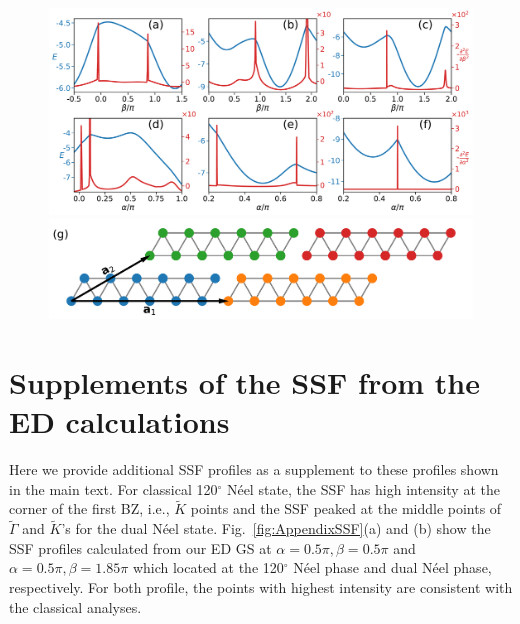\documentclass[aps,prb,reprint,amsfonts,amsmath,amssymb,showpacs,groupedaddress,superscriptaddress]{revtex4-1}
\begin{document}
{\begin{figure}
  \centering
  \includegraphics[width=\columnwidth]{fig/SecondDerivatives26.pdf}
  \includegraphics[width=\columnwidth]{fig/Cluster26.pdf}
\end{figure}
}

\section{\label{apx:SSF}Supplements of the SSF from the ED calculations}

Here we provide additional SSF profiles as a supplement to these profiles shown in the main text. For classical 120$^\circ$ N\'{e}el state, the SSF has high intensity at the corner of the first BZ, i.e., $\tilde{K}$ points and the SSF peaked at the middle points of $\tilde{\Gamma}$ and $\tilde{K}$'s for the dual N\'{e}el state. Fig.~\ref{fig:AppendixSSF}(a) and (b) show the SSF profiles calculated from our ED GS at $\alpha=0.5\pi, \beta=0.5\pi$ and $\alpha=0.5\pi, \beta=1.85\pi$ which located at the 120$^\circ$ N\'{e}el phase and dual N\'{e}el phase, respectively. For both profile, the points with highest intensity are consistent with the classical analyses.
\end{document}
